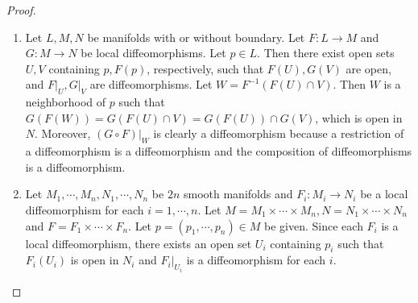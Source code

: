 \begin{proof}
  $ $
  \begin{enumerate}[label=(\alph*)]
    \item 
      Let $L, M, N$ be manifolds with or without boundary.
      Let $F: L \rightarrow M$ and $G: M \rightarrow N$ be local diffeomorphisms.
      Let $p \in L$.
      Then there exist open sets $U, V$ containing $p, F(p)$, respectively, such that $F(U), G(V)$ are open, and $F\vert_U, G\vert_V$ are diffeomorphisms.
      Let $W = F^{-1}(F(U) \cap V)$.
      Then $W$ is a neighborhood of $p$ such that $G(F(W)) = G(F(U) \cap V) = G(F(U)) \cap G(V)$, which is open in $N$.
      Moreover, $(G \circ F)\vert_{W}$ is clearly a diffeomorphism because a restriction of a diffeomorphism is a diffeomorphism and the composition of diffeomorphisms is a diffeomorphism.
    \item
      Let $M_1, \cdots, M_n, N_1, \cdots, N_n$ be $2n$ smooth manifolds and $F_i: M_i \rightarrow N_i$ be a local diffeomorphism for each $i = 1, \cdots, n$.
      Let $M = M_1 \times \cdots \times M_n, N = N_1 \times \cdots \times N_n$ and $F = F_1 \times \cdots \times F_n$.
      Let $p = (p_1, \cdots, p_n) \in M$ be given.
      Since each $F_i$ is a local diffeomorphism, there exists an open set $U_i$ containing $p_i$ such that $F_i(U_i)$ is open in $N_i$ and $F_i\vert_{U_i}$ is a diffeomorphism for each $i$.


\end{enumerate}
\end{proof}
